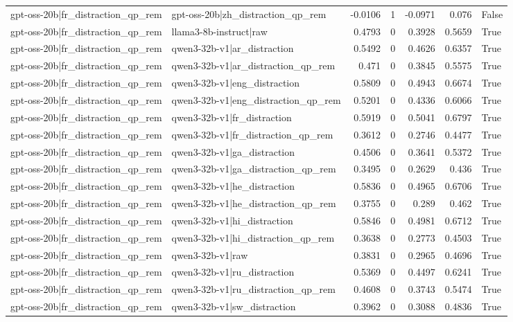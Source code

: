\begin{table}
\begin{tabular}{l l r r r r l}
gpt-oss-20b|fr_distraction_qp_rem & gpt-oss-20b|zh_distraction_qp_rem & -0.0106 & 1 & -0.0971 & 0.076 & False \\
gpt-oss-20b|fr_distraction_qp_rem & llama3-8b-instruct|raw & 0.4793 & 0 & 0.3928 & 0.5659 & True \\
gpt-oss-20b|fr_distraction_qp_rem & qwen3-32b-v1|ar_distraction & 0.5492 & 0 & 0.4626 & 0.6357 & True \\
gpt-oss-20b|fr_distraction_qp_rem & qwen3-32b-v1|ar_distraction_qp_rem & 0.471 & 0 & 0.3845 & 0.5575 & True \\
gpt-oss-20b|fr_distraction_qp_rem & qwen3-32b-v1|eng_distraction & 0.5809 & 0 & 0.4943 & 0.6674 & True \\
gpt-oss-20b|fr_distraction_qp_rem & qwen3-32b-v1|eng_distraction_qp_rem & 0.5201 & 0 & 0.4336 & 0.6066 & True \\
gpt-oss-20b|fr_distraction_qp_rem & qwen3-32b-v1|fr_distraction & 0.5919 & 0 & 0.5041 & 0.6797 & True \\
gpt-oss-20b|fr_distraction_qp_rem & qwen3-32b-v1|fr_distraction_qp_rem & 0.3612 & 0 & 0.2746 & 0.4477 & True \\
gpt-oss-20b|fr_distraction_qp_rem & qwen3-32b-v1|ga_distraction & 0.4506 & 0 & 0.3641 & 0.5372 & True \\
gpt-oss-20b|fr_distraction_qp_rem & qwen3-32b-v1|ga_distraction_qp_rem & 0.3495 & 0 & 0.2629 & 0.436 & True \\
gpt-oss-20b|fr_distraction_qp_rem & qwen3-32b-v1|he_distraction & 0.5836 & 0 & 0.4965 & 0.6706 & True \\
gpt-oss-20b|fr_distraction_qp_rem & qwen3-32b-v1|he_distraction_qp_rem & 0.3755 & 0 & 0.289 & 0.462 & True \\
gpt-oss-20b|fr_distraction_qp_rem & qwen3-32b-v1|hi_distraction & 0.5846 & 0 & 0.4981 & 0.6712 & True \\
gpt-oss-20b|fr_distraction_qp_rem & qwen3-32b-v1|hi_distraction_qp_rem & 0.3638 & 0 & 0.2773 & 0.4503 & True \\
gpt-oss-20b|fr_distraction_qp_rem & qwen3-32b-v1|raw & 0.3831 & 0 & 0.2965 & 0.4696 & True \\
gpt-oss-20b|fr_distraction_qp_rem & qwen3-32b-v1|ru_distraction & 0.5369 & 0 & 0.4497 & 0.6241 & True \\
gpt-oss-20b|fr_distraction_qp_rem & qwen3-32b-v1|ru_distraction_qp_rem & 0.4608 & 0 & 0.3743 & 0.5474 & True \\
gpt-oss-20b|fr_distraction_qp_rem & qwen3-32b-v1|sw_distraction & 0.3962 & 0 & 0.3088 & 0.4836 & True \\

\end{tabular}
\end{table}
